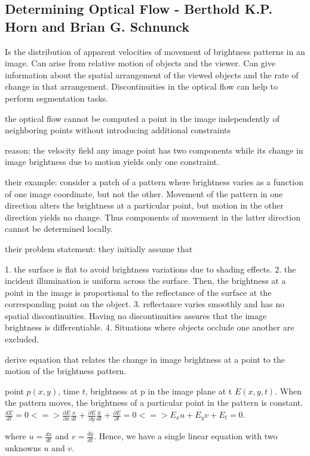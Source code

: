 \subsection{Determining Optical Flow - Berthold K.P. Horn and Brian G. Schnunck}

Is the distribution of apparent velocities of movement of brightness patterns in an image.
Can arise from relative motion of objects and the viewer.
Can give information about the spatial arrangement of the viewed objects and the rate of change in that arrangement.
Discontinuities in the optical flow can help to perform segmentation tasks.

the optical flow cannot be computed a point in the image independently of neighboring points without introducing additional constraints

reason: the velocity field any image point has two components while its change in image brightness due to motion yields only one constraint.

their example: consider a patch of a pattern where brightness varies as a function of one image coordinate, but not the other. Movement of the pattern in one direction alters the brightness at a particular point, but motion in the other direction yields no change. Thus components of movement in the latter direction cannot be determined locally.

their problem statement:
they initially assume that 

1. the surface is flat to avoid brightness variations due to shading effects.
2. the incident illumination is uniform across the surface. Then, the brightness at a point in the image is proportional to the reflectance of the surface at the corresponding point on the object.
3. reflectance varies smoothly and has no spatial discontinuities. Having no discontinuities assures that the image brightness is differentiable.
4. Situations where objects occlude one another are excluded.

derive equation that relates the change in image brightness at a point to the motion of the brightness pattern.

point $p(x,y)$, time $t$, brightness at p in the image plane at t $E(x,y,t)$.
When the pattern moves, the brightness of a particular point in the pattern is constant. 
$\frac{d E}{dt} = 0 <=> \frac{\partial E}{\partial x} \frac{x}{dt} + \frac{\partial E}{\partial y} \frac{y}{dt} + \frac{\partial E}{\partial t} = 0 <=> E_{x} u + E_{y} v + E_{t} = 0$.

where $u = \frac{dx}{dt}$ and $v = \frac{dy}{dt}$. Hence, we have a single linear equation with two unknowns $u$ and $v$.

